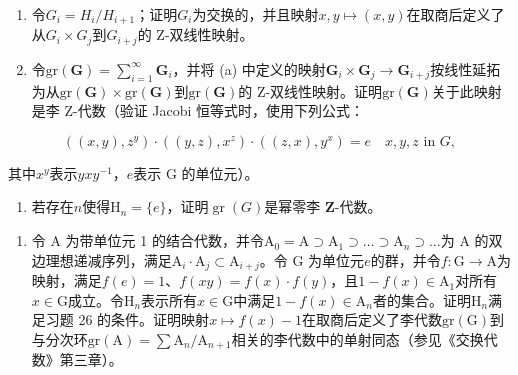 \begin{enumerate}
\def\labelenumi{(\alph{enumi})}
\item
  令\(G_{i} = H_{i}/H_{i+1}\)；证明\(G_{i}\)为交换的，并且映射\(x, y \mapsto (x, y)\)在取商后定义了从\(G_{i} \times G_{j}\)到\(G_{i+j}\)的 Z-双线性映射。
\item
  令\(\mathrm{gr}(\mathbf{G}) = \sum_{i=1}^{\infty} \mathbf{G}_i\)，并将 (a) 中定义的映射\(\mathbf{G}_i \times \mathbf{G}_j \to \mathbf{G}_{i+j}\)按线性延拓为从\(\mathrm{gr}(\mathbf{G}) \times \mathrm{gr}(\mathbf{G})\)到\(\mathrm{gr}(\mathbf{G})\)的 Z-双线性映射。证明\(\mathrm{gr}(\mathbf{G})\)关于此映射是李 Z-代数（验证 Jacobi 恒等式时，使用下列公式：
\end{enumerate}

\[
((x, y), z ^ {y}) \cdot ((y, z), x ^ {z}) \cdot ((z, x), y ^ {x}) = e \quad x, y, z \text {   in   } G,
\]

其中\(x^{y}\)表示\(yxy^{-1}\)，\(e\)表示 G 的单位元）。

\begin{enumerate}
\def\labelenumi{(\alph{enumi})}
\setcounter{enumi}{2}
\tightlist
\item
  若存在\(n\)使得\(\mathrm{H}_n = \{e\}\)，证明\(\operatorname{gr}(G)\)是幂零李 \(\mathbf{Z}\)-代数。
\end{enumerate}

\begin{enumerate}
\def\labelenumi{\arabic{enumi}.}
\setcounter{enumi}{26}
\tightlist
\item
   令 A 为带单位元 1 的结合代数，并令\(\mathrm{A}_0 = \mathrm{A} \supset \mathrm{A}_1 \supset \dots \supset \mathrm{A}_n \supset \dots\)为 A 的双边理想递减序列，满足\(\mathrm{A}_i \cdot \mathrm{A}_j \subset \mathrm{A}_{i+j}\)。令 G 为单位元\(e\)的群，并令\(f: \mathrm{G} \to \mathrm{A}\)为映射，满足\(f(e) = 1\)、\(f(xy) = f(x) \cdot f(y)\)，且\(1 - f(x) \in \mathrm{A}_1\)对所有\(x \in \mathrm{G}\)成立。令\(\mathrm{H}_n\)表示所有\(x \in \mathrm{G}\)中满足\(1 - f(x) \in \mathrm{A}_n\)者的集合。证明\(\mathrm{H}_n\)满足习题 26 的条件。证明映射\(x \mapsto f(x) - 1\)在取商后定义了李代数\(\mathrm{gr}(\mathrm{G})\)到与分次环\(\mathrm{gr}(\mathrm{A}) = \sum \mathrm{A}_n / \mathrm{A}_{n+1}\)相关的李代数中的单射同态（参见《交换代数》第三章）。
\end{enumerate}


